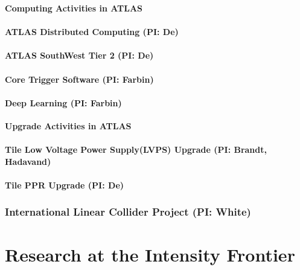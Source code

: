 \documentclass[11pt]{article}
\def\overhead#1{\part{#1}}
\def\onehead#1{\section{#1}}
\def\twohead#1{\subsection{#1}}
\def\centerhead#1{
	\begin{center}
	\Large\textbf{#1}
	\end{center}}
\begin{document}
\centerhead{Computing Activities in ATLAS}



\twohead{ATLAS Distributed Computing (PI: De)}


\twohead{ATLAS SouthWest Tier 2 (PI: De)}


\twohead{Core Trigger Software (PI: Farbin)}

\twohead{Deep Learning (PI: Farbin)}


\centerhead{Upgrade Activities in ATLAS}

\twohead{Tile Low Voltage Power Supply(LVPS) Upgrade  (PI: Brandt, Hadavand)}
\label{sec:Tile-HL-LHC}


\twohead{Tile PPR Upgrade (PI: De)}


\onehead{International Linear Collider Project (PI: White)}









\newpage


\overhead{Research at the Intensity Frontier}




\end{document}
